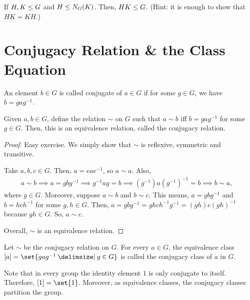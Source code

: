 \documentclass[11pt]{penrose}
\begin{document}
\begin{nex}
    If $H, K \mathrel{\leq} G$ and $H \mathrel{\leq} N_{G}(K)$. Then, $HK \mathrel{\leq} G$. (Hint: it is enough to show that $HK = KH$.)
\end{nex}


\section{Conjugacy Relation \& the Class Equation}
\begin{ndfn}
    An element $b \in G$ is called conjugate of $a \in G$ if for some $g \in G$, we have $b = g a g^{-1}$.
\end{ndfn}

\begin{nthm}
    Given $a,b \in G$, define the relation $\sim$ on $G$ such that $a \sim b$ iff $b = g a g^{-1}$ for some $g \in G$. Then, this is an equivalence relation, called the conjugacy relation.
\end{nthm}
\begin{proof}
    Easy exercise. We simply show that $\sim$ is reflexive, symmetric and transitive.

    Take $a, b, c \in G$. Then, $a = e a e^{-1}$, so $a \sim a$. Also,
    \begin{align*}
        a \sim b
        \implies
        a = g b g^{-1}
        \implies
        g^{-1} a g = b
        \implies
        (g^{-1}) a (g^{-1})^{-1} = b
        \implies
        b \sim a,
    \end{align*}
    where $g \in G$. Moreover, suppose $a \sim b$ and $b \sim c$. This means, $a = g b g^{-1}$ and $b = h c h^{-1}$ for some $g, h \in G$. Then, $a = g b g^{-1} = g h c h^{-1} g^{-1} = (gh) c (gh)^{-1}$ because $gh \in G$. So, $a \sim c$.

    Overall, $\sim$ is an equivalence relation.
\end{proof}

\begin{ndfn}
    Let $\sim$ be the conjugacy relation on $G$. For every $a \in G$, the equivalence class $[a] = \set{ g a g^{-1} \st g \in G }$ is called the conjugacy class of $a$ in $G$.
\end{ndfn}

Note that in every group the identity element $1$ is only conjugate to itself. Therefore, $[1] = \set{1}$. Moreover, as equivalence classes, the conjugacy classes partition the group.
\end{document}
